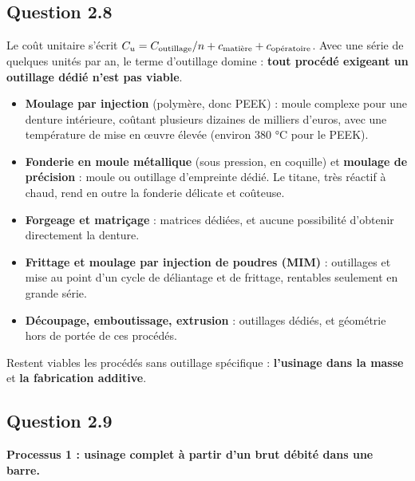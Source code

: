\documentclass[11pt,a4paper]{article}
\providecommand{\tightlist}{\setlength{\itemsep}{0pt}\setlength{\parskip}{0pt}}
\begin{document}
\hypertarget{question-2.8}{%
\subsection{Question 2.8}\label{question-2.8}}

Le coût unitaire s'écrit \(C_u = C_{\text{outillage}}/n + c_{\text{\text{matière}}} + c_{\text{\text{opératoire}}}\). Avec une série de quelques unités par an, le terme d'outillage domine : \textbf{tout procédé exigeant un outillage dédié n'est pas viable}.

\begin{itemize}
\tightlist
\item
  \textbf{Moulage par injection} (polymère, donc PEEK) : moule complexe pour une denture intérieure, coûtant plusieurs dizaines de milliers d'euros, avec une température de mise en œuvre élevée (environ 380 °C pour le PEEK).
\item
  \textbf{Fonderie en moule métallique} (sous pression, en coquille) et \textbf{moulage de précision} : moule ou outillage d'empreinte dédié. Le titane, très réactif à chaud, rend en outre la fonderie délicate et coûteuse.
\item
  \textbf{Forgeage et matriçage} : matrices dédiées, et aucune possibilité d'obtenir directement la denture.
\item
  \textbf{Frittage et moulage par injection de poudres (MIM)} : outillages et mise au point d'un cycle de déliantage et de frittage, rentables seulement en grande série.
\item
  \textbf{Découpage, emboutissage, extrusion} : outillages dédiés, et géométrie hors de portée de ces procédés.
\end{itemize}

Restent viables les procédés sans outillage spécifique : \textbf{l'usinage dans la masse} et \textbf{la fabrication additive}.

\hypertarget{question-2.9}{%
\subsection{Question 2.9}\label{question-2.9}}

\textbf{Processus 1 : usinage complet à partir d'un brut débité dans une barre.}
\end{document}
